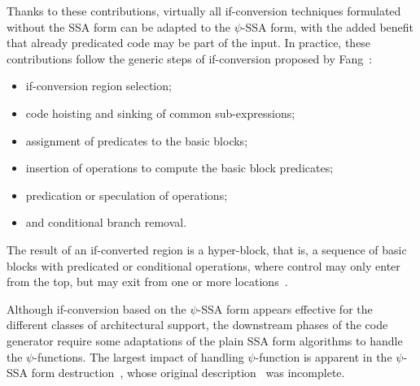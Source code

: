 Thanks to these contributions, virtually all if-conversion techniques formulated
without the SSA form can be adapted to the $\psi$-SSA form, with the added
benefit that already predicated code may be part of the input. In practice, these
contributions follow the generic steps of if-conversion proposed by Fang~\cite{Fang:1996:LCPC}:
\begin{itemize}
\item if-conversion region selection;
\item code hoisting and sinking of common sub-expressions;
\item assignment of predicates to the basic blocks;
\item insertion of operations to compute the basic block predicates;
\item predication or speculation of operations;
\item and conditional branch removal.
\end{itemize}
The result of an if-converted region is a hyper-block, that is, a sequence of
basic blocks with predicated or conditional operations, where control may only
enter from the top, but may exit from one or more locations~\cite{Mahlke:1992:ECS:144965.144998}.

\medskip
Although if-conversion based on the $\psi$-SSA form appears effective for the
different classes of architectural support, the downstream phases of the code
generator require some adaptations of the plain SSA form algorithms to
handle the $\psi$-functions. The largest impact of handling $\psi$-function is
apparent in the $\psi$-SSA form destruction~\cite{Ferriere:2007:SCOPES}, whose
original description~\cite{Stoutchinin:2001:MICRO} was incomplete.

